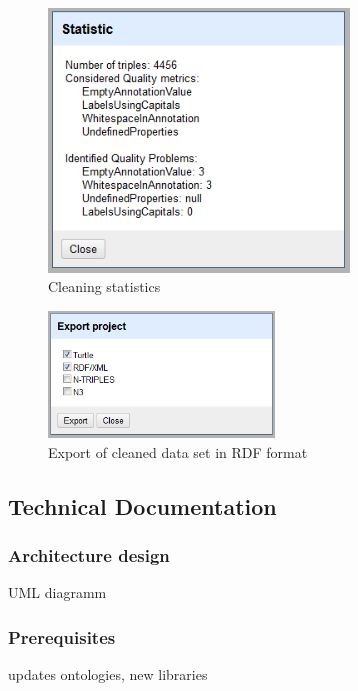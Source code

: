\begin{figure}[ht!]
\centering
\includegraphics[width=8cm]{figures/statistics.png}
\caption{Cleaning statistics}
\label{fig:statistics}
\end{figure}


\begin{figure}[ht!]
\centering
\includegraphics[width=6cm]{figures/export.png}
\caption{Export of cleaned data set in RDF format}
\label{fig:export}
\end{figure}




\subsection{Technical Documentation}


\subsubsection{Architecture design}
UML diagramm
\subsubsection{Prerequisites}
updates ontologies,
new libraries

